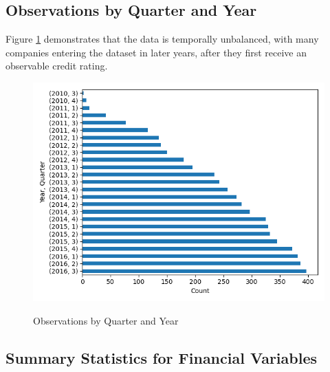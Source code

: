 \documentclass{article}[11pt]
\begin{document}
    \clearpage
    \newpage

    \subsection{Observations by Quarter and Year}

    Figure \ref{fig:obs-by-quarter-year} demonstrates that the data is temporally unbalanced, with many companies entering the dataset in later years, after they first receive an observable credit rating.

    \begin{figure}[h!]
		\centering
        \caption{Observations by Quarter and Year}
        \includegraphics[width=0.6\linewidth,keepaspectratio=true]{../Output/All Data EDA/Tabular EDA/all_data_fixed_quarter_dates_obs_by_year_quarter_no_title.png}
        \label{fig:obs-by-quarter-year}
	\end{figure}
    




    \clearpage
    \newpage

    \subsection{Summary Statistics for Financial Variables}
\end{document}
